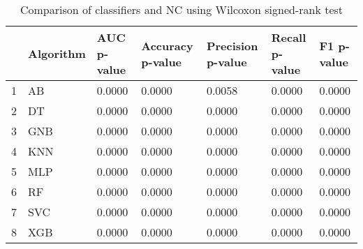 \begin{table}
\footnotesize
\caption{Comparison of classifiers and NC using Wilcoxon signed-rank test}
\label{tab:wilcoxon comparison}
\begin{tabular}{lllllll}
\hline
 & Algorithm & AUC p-value & Accuracy p-value & Precision p-value & Recall p-value & F1 p-value \\
\hline
1 & AB & 0.0000 & 0.0000 & 0.0058 & 0.0000 & 0.0000 \\
2 & DT & 0.0000 & 0.0000 & 0.0000 & 0.0000 & 0.0000 \\
3 & GNB & 0.0000 & 0.0000 & 0.0000 & 0.0000 & 0.0000 \\
4 & KNN & 0.0000 & 0.0000 & 0.0000 & 0.0000 & 0.0000 \\
5 & MLP & 0.0000 & 0.0000 & 0.0000 & 0.0000 & 0.0000 \\
6 & RF & 0.0000 & 0.0000 & 0.0000 & 0.0000 & 0.0000 \\
7 & SVC & 0.0000 & 0.0000 & 0.0000 & 0.0000 & 0.0000 \\
8 & XGB & 0.0000 & 0.0000 & 0.0000 & 0.0000 & 0.0000 \\
\hline
\end{tabular}
\end{table}
